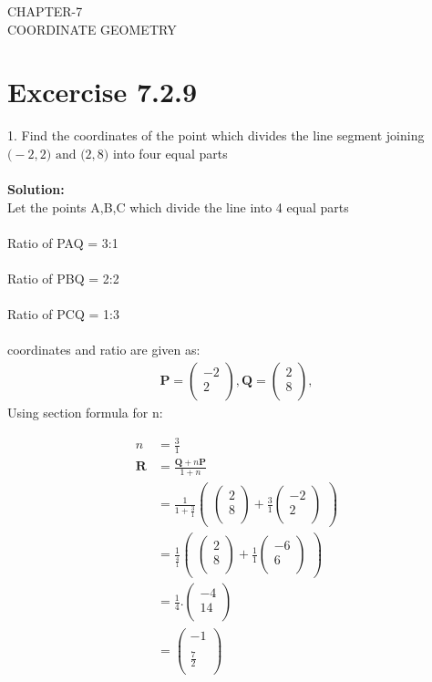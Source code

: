 \documentclass[12pt]{article}
\newcommand{\solution}{\noindent \textbf{Solution: }}
\newcommand{\myvec}[1]{\ensuremath{\begin{pmatrix}#1\end{pmatrix}}}
\let\vec\mathbf
\begin{document}
\begin{center}
\textbf\large{CHAPTER-7 \\ COORDINATE GEOMETRY}
\end{center}
\section*{Excercise 7.2.9}

1. Find the coordinates of the point which divides the line segment joining $\vec(-2,2) \text{ and } \vec(2,8)$ into four equal parts
\\
\\
\solution\\		
Let the points A,B,C which divide the line into 4 equal parts\\
\\
Ratio of PAQ = 3:1\\
\\
Ratio of PBQ = 2:2\\
\\
Ratio of PCQ = 1:3\\
\\
coordinates and ratio are given as:
\begin{align}
\vec{P}=\myvec{-2\\2\\},
\vec{Q}=\myvec{2\\8\\},
\end{align}
Using section formula for n:
    
\begin{align}
n&=\frac{3}{1}\\
\vec{R}&=\frac{\vec{Q}+n\vec{P}}{1+n}\\
&=\frac{1}{1+\frac{3}{1}}  \myvec{\myvec{
2\\
8\\
}
  +
   \frac{3}{1}\myvec{
-2\\
2\\
}}\\
&= \frac{1}{\frac{4}{1}} \myvec{\myvec{
2\\
8\\
}
  +
\frac{1}{1}\myvec{
-6\\
6\\
}} \\
&=\frac{1}{4}.
\myvec{
-4\\
14\\
}\\
&=\myvec{
-1\\
\\
\frac{7}{2}\\
}
\end{align}
\end{document}
